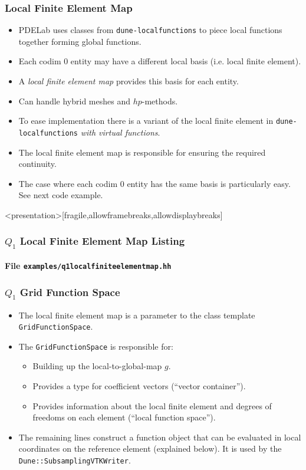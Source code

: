 \begin{frame}
\frametitle{Local Finite Element Map}
\begin{itemize}
\item PDELab uses classes from \lstinline{dune-localfunctions} to 
piece local functions together forming global functions.
\item Each codim 0 entity may have a different local basis (i.e. local finite element).
\item A \textit{local finite element map} provides this basis for each entity.
\item Can handle hybrid meshes and $hp$-methods.
\item To ease implementation there is a variant of the 
local finite element in \lstinline{dune-localfunctions} \textit{with virtual functions}.
\item The local finite element map is responsible for ensuring
the required continuity.
\item The case where each codim 0 entity has the same basis is 
particularly easy. See next code example.
\end{itemize}
\end{frame}

\begin{frame}<presentation>[fragile,allowframebreaks,allowdisplaybreaks]
\frametitle<presentation>{$Q_1$ Local Finite Element Map Listing}
\framesubtitle<presentation>{File \texttt{examples/q1localfiniteelementmap.hh}}

\end{frame}


\begin{frame}
\frametitle{$Q_1$ Grid Function Space}
\begin{itemize}
\item The local finite element map is a parameter to 
the class template \lstinline{GridFunctionSpace}.

\item The \lstinline{GridFunctionSpace} is responsible for:
\begin{itemize}
\item Building up the local-to-global-map $g$.
\item Provides a type for coefficient vectors (``vector container'').
\item Provides information about the local finite element and degrees of freedoms
on each element (``local function space'').
\end{itemize}

\item The remaining lines construct a function object that can be evaluated
in local coordinates on the reference element (explained below). It is used
by the \lstinline{Dune::SubsamplingVTKWriter}.
\end{itemize}
\end{frame}

